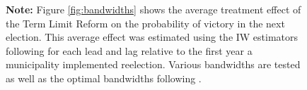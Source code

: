 \documentclass[12pt]{amsart}
\numberwithin{equation}{section}
\theoremstyle{definition}
\theoremstyle{definition}
\theoremstyle{definition}
\begin{document}
\begin{appendix}
\begin{figure}[h]
 \textbf{Note:} Figure \ref{fig:bandwidths} shows the average treatment effect of the Term Limit Reform on the probability of victory in the next election. This average effect was estimated using the IW estimators following \citet{abraham_sun_2020} for each lead and lag relative to the first year a municipality implemented reelection. Various bandwidths are tested as well as the optimal bandwidths following \citet{calonicoetal_2014}. 
   
\end{figure}    

\end{appendix}
\end{document}
